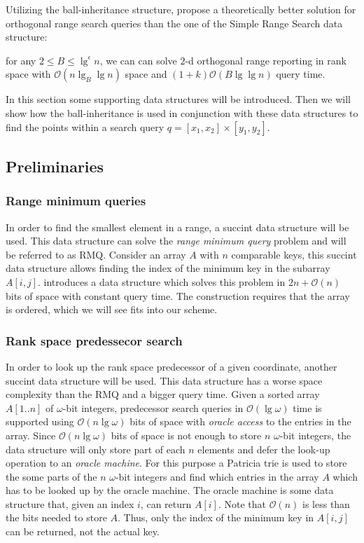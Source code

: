Utilizing the ball-inheritance structure, \citet{chanetal} propose a theoretically better solution for orthogonal range search queries than the one of the Simple Range Search data structure: 
\begin{customthm}{2.1}\label{theorem21}
for any $2 \leq B \leq \lg^\epsilon n$, we can can solve $2$-d orthogonal range reporting in rank space with $\mathcal{O}(n \lg_B \lg n)$ space and $(1+k)\mathcal{O}(B \lg \lg n)$ query time.
\end{customthm}

In this section some supporting data structures will be introduced. Then we will show how the ball-inheritance is used in conjunction with these data structures to find the points within a search query $q = [x_1, x_2] \times [y_1, y_2]$.

\subsection{Preliminaries}

\subsubsection{Range minimum queries}
In order to find the smallest element in a range, a succint data structure will be used. This data structure can solve the \emph{range minimum query} problem and will be referred to as RMQ. 
Consider an array $A$ with $n$ comparable keys, this succint data structure allows finding the index of the minimum key in the subarray $A[i,j]$. \citet{fischer} introduces a data structure which solves this problem in $2n + \mathcal{O}(n)$ bits of space with constant query time. The construction requires that the array is ordered, which we will see fits into our scheme.

\subsubsection{Rank space predessecor search}
In order to look up the rank space predecessor of a given coordinate, another succint data structure will be used. This data structure has a worse space complexity than the RMQ and a bigger query time.
Given a sorted array $A[1..n]$ of $\omega$-bit integers, predecessor search queries in $\mathcal{O}(\lg \omega)$ time is supported using $\mathcal{O}(n \lg \omega)$ bits of space with \emph{oracle access} to the entries in the array. Since $\mathcal{O}(n \lg \omega)$ bits of space is not enough to store $n$ $\omega$-bit integers, the data structure will only store part of each $n$ elements and defer the look-up operation to an \emph{oracle machine}. For this purpose a Patricia trie \cite{morehaste} is used to store the some parts of the $n$ $\omega$-bit integers and find which entries in the array $A$ which has to be looked up by the oracle machine. The oracle machine is some data structure that, given an index $i$, can return $A[i]$. Note that $\mathcal{O}(n)$ is less than the bits needed to store $A$. Thus, only the index of the minimum key in $A[i,j]$ can be returned, not the actual key.

